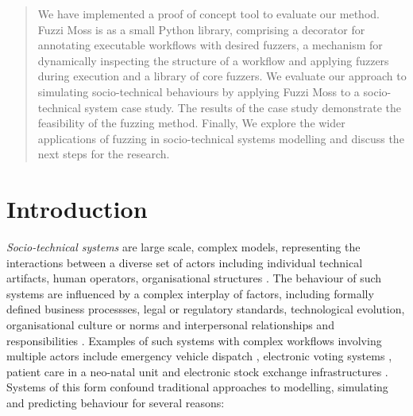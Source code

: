 \documentclass{sig-alternate}
\begin{document}
\begin{abstract}
  We have implemented a proof of concept tool to evaluate our method. Fuzzi Moss is as a small Python library,
  comprising a decorator for annotating executable workflows with desired fuzzers, a mechanism for dynamically
  inspecting the structure of a workflow and applying fuzzers during execution and a library of core fuzzers.  We
  evaluate our approach to simulating socio-technical behaviours by applying Fuzzi Moss to a socio-technical system case
  study.  The results of the case study demonstrate the feasibility of the fuzzing method.  Finally, We explore the
  wider applications of fuzzing in socio-technical systems modelling and discuss the next steps for the research.

\end{abstract}


\section{Introduction}
\label{sec:introduction}


\emph{Socio-technical systems} are large scale, complex models, representing the interactions between a diverse set of
actors including individual technical artifacts, human operators, organisational structures
\citep{Susman1976,elhassan07role,sommerville08socio}.  The behaviour of such systems are influenced by a complex
interplay of factors, including formally defined business processses, legal or regulatory standards, technological
evolution, organisational culture or norms and interpersonal relationships and responsibilities
\citep{bade07structures,pentland05organisational}. Examples of such systems with complex workflows involving multiple
actors include emergency vehicle dispatch \citep{robinson96limited}, electronic voting systems
\citep{bryans04towards,lock07observations}, patient care in a neo-natal unit \citep{baxter07evaluating} and electronic
stock exchange infrastructures \citep{cftc-sec10findings}.  Systems of this form confound traditional approaches to
modelling, simulating and predicting behaviour for several reasons:
\end{document}
